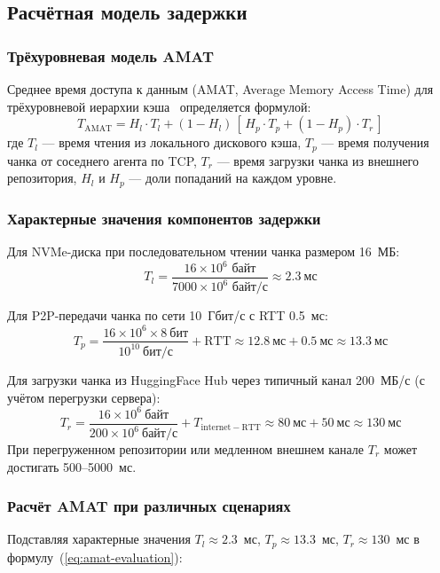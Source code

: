 \subsection{Расчётная модель задержки}

\subsubsection*{Трёхуровневая модель AMAT}

Среднее время доступа к данным (AMAT, Average Memory Access Time) для трёхуровневой иерархии кэша~\cite{hennessy2011ca} определяется формулой:
\begin{equation}
  T_{\mathrm{AMAT}} = H_l \cdot T_l + (1 - H_l)\,[\,H_p \cdot T_p + (1 - H_p) \cdot T_r\,]
  \label{eq:amat-evaluation}
\end{equation}
где $T_l$ --- время чтения из локального дискового кэша, $T_p$ --- время получения чанка от соседнего агента по TCP, $T_r$ --- время загрузки чанка из внешнего репозитория, $H_l$ и $H_p$ --- доли попаданий на каждом уровне.

\subsubsection*{Характерные значения компонентов задержки}

Для NVMe-диска при последовательном чтении чанка размером 16~МБ:
\[
  T_l = \frac{16 \times 10^6 \text{ байт}}{7000 \times 10^6 \text{ байт/с}} \approx 2.3~\text{мс}
\]

Для P2P-передачи чанка по сети 10~Гбит/с с RTT 0.5~мс:
\[
  T_p = \frac{16 \times 10^6 \times 8~\text{бит}}{10^{10}~\text{бит/с}} + \mathrm{RTT} \approx 12.8~\text{мс} + 0.5~\text{мс} \approx 13.3~\text{мс}
\]

Для загрузки чанка из HuggingFace Hub через типичный канал 200~МБ/с (с учётом перегрузки сервера):
\[
  T_r = \frac{16 \times 10^6~\text{байт}}{200 \times 10^6~\text{байт/с}} + T_{\mathrm{internet-RTT}} \approx 80~\text{мс} + 50~\text{мс} \approx 130~\text{мс}
\]
При перегруженном репозитории или медленном внешнем канале $T_r$ может достигать 500--5000~мс.

\subsubsection*{Расчёт AMAT при различных сценариях}

Подставляя характерные значения $T_l \approx 2.3$~мс, $T_p \approx 13.3$~мс, $T_r \approx 130$~мс в формулу~(\ref{eq:amat-evaluation}):

